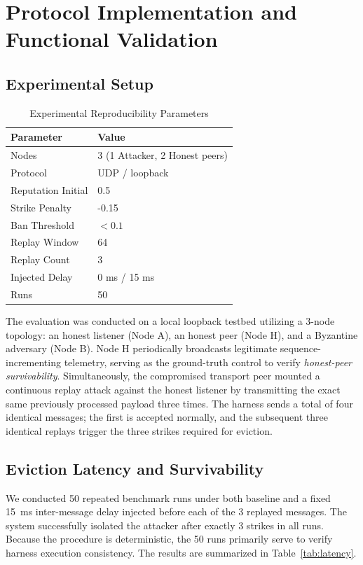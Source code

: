 \documentclass[conference]{IEEEtran}
\begin{document}
\section{Protocol Implementation and Functional Validation}
\label{sec:results}

\subsection{Experimental Setup}

\begin{table}[h]
\centering
\caption{Experimental Reproducibility Parameters}
\begin{tabular}{ll}
\toprule
\textbf{Parameter} & \textbf{Value} \\
\midrule
Nodes & 3 (1 Attacker, 2 Honest peers) \\
Protocol & UDP / loopback \\
Reputation Initial & 0.5 \\
Strike Penalty & -0.15 \\
Ban Threshold & $< 0.1$ \\
Replay Window & 64 \\
Replay Count & 3 \\
Injected Delay & 0 ms / 15 ms \\
Runs & 50 \\
\bottomrule
\end{tabular}
\label{tab:reproducibility}
\end{table}

The evaluation was conducted on a local loopback testbed utilizing a 3-node topology: an honest listener (Node A), an honest peer (Node H), and a Byzantine adversary (Node B). Node H periodically broadcasts legitimate sequence-incrementing telemetry, serving as the ground-truth control to verify \textit{honest-peer survivability}. Simultaneously, the compromised transport peer mounted a continuous replay attack against the honest listener by transmitting the exact same previously processed payload three times. The harness sends a total of four identical messages; the first is accepted normally, and the subsequent three identical replays trigger the three strikes required for eviction.

\subsection{Eviction Latency and Survivability}
We conducted 50 repeated benchmark runs under both baseline and a fixed 15~ms inter-message delay injected before each of the 3 replayed messages. The system successfully isolated the attacker after exactly 3 strikes in all runs. Because the procedure is deterministic, the 50 runs primarily serve to verify harness execution consistency. The results are summarized in Table~\ref{tab:latency}.
\end{document}
